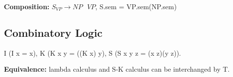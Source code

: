 \textbf{Composition:} $S_{VP} \rightarrow NP \text{ } VP$, S.sem = VP.sem(NP.sem)

\subsection{Combinatory Logic}
I (I x = x), K (K x y = ((K x) y), S (S x y z = (x z)(y z)).
\begin{comment}
	Terms constructed by application of variables and combinators.\\
	One can say that I and (S K K) x are extensively equivalent: (S K K) x = (S K K x) = (K x)(K x) = (K x) x = x = I, we don't need I.\\
\end{comment} 

\textbf{Equivalence:} lambda calculus and S-K calculus can be interchanged by T.\\
\begin{comment}
	T can be seen as transformator.\\
\end{comment}


\endinput


\subsection{Combinatory Categorical Grammars}
\begin{comment}
	Why combinatory categorical grammars?\\
	\textbf{Coordination:} I like play bridge and Sara Handball; can not be modelled by CFG.\\
	\textbf{Cross-serial dependencies}, like in dutch language, are not context-free.\\
\end{comment}

\textbf{Linear Indexed Languages:} $G = \langle \mathcal{N}, \mathcal{S}, \mathcal{I}, \Sigma, \mathcal{R} \rangle$, $N[\sigma] \rightarrow \alpha M[f\sigma] \beta$, are rules, $f \in \mathcal{I}$, $\alpha,\beta \in \Sigma$ \\
\begin{comment}
	It is possible to generate strings like $a^nb^nc^n$ with this grammar.\\
	With each application of a rule, indices can be put on the stack. Most of the time, the rules build a stack and then reduce it. In the reduction phase, the indices can be used differentiate the different cases that put elements of the alphabet between $\alpha, \beta$.\\
\end{comment}  

